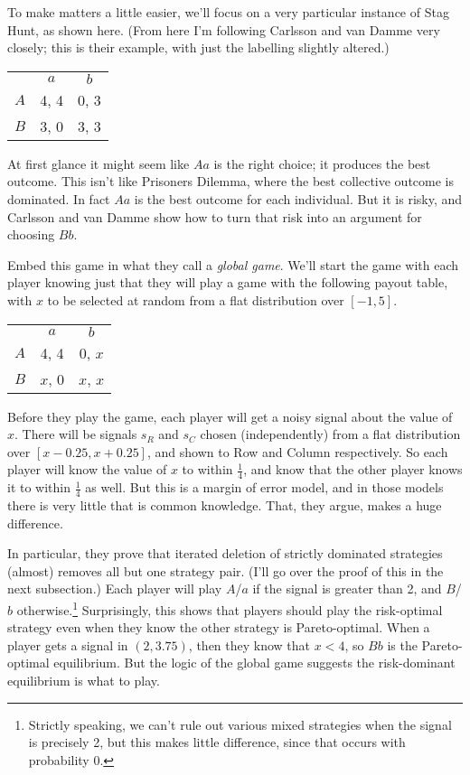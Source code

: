 \documentclass[11pt,]{book}
\let\rmarkdownfootnote\footnote%
\def\footnote{\protect\rmarkdownfootnote}
\def\toprule{}
\def\bottomrule{}
\begin{document}
To make matters a little easier, we'll focus on a very particular instance of Stag Hunt, as shown here. (From here I'm following Carlsson and van Damme very closely; this is their example, with just the labelling slightly altered.)

\begin{longtable}[]{@{}lcc@{}}
\toprule
\endhead
& \(a\) & \(b\)\tabularnewline
\(A\) & 4, 4 & 0, 3\tabularnewline
\(B\) & 3, 0 & 3, 3\tabularnewline
\bottomrule
\end{longtable}

At first glance it might seem like \(Aa\) is the right choice; it produces the best outcome. This isn't like Prisoners Dilemma, where the best collective outcome is dominated. In fact \(Aa\) is the best outcome for each individual. But it is risky, and Carlsson and van Damme show how to turn that risk into an argument for choosing \(Bb\).

Embed this game in what they call a \emph{global game}. We'll start the game with each player knowing just that they will play a game with the following payout table, with \(x\) to be selected at random from a flat distribution over \([-1, 5]\).

\begin{longtable}[]{@{}lcc@{}}
\toprule
\endhead
& \(a\) & \(b\)\tabularnewline
\(A\) & 4, 4 & 0, \(x\)\tabularnewline
\(B\) & \(x\), 0 & \(x\), \(x\)\tabularnewline
\bottomrule
\end{longtable}

Before they play the game, each player will get a noisy signal about the value of \(x\). There will be signals \(s_R\) and \(s_C\) chosen (independently) from a flat distribution over \([x - 0.25, x + 0.25]\), and shown to Row and Column respectively. So each player will know the value of \(x\) to within \(\frac{1}{4}\), and know that the other player knows it to within \(\frac{1}{4}\) as well. But this is a margin of error model, and in those models there is very little that is common knowledge. That, they argue, makes a huge difference.

In particular, they prove that iterated deletion of strictly dominated strategies (almost) removes all but one strategy pair. (I'll go over the proof of this in the next subsection.) Each player will play \(A\)/\(a\) if the signal is greater than 2, and \(B\)/\(b\) otherwise.\footnote{Strictly speaking, we can't rule out various mixed strategies when the signal is precisely 2, but this makes little difference, since that occurs with probability 0.} Surprisingly, this shows that players should play the risk-optimal strategy even when they know the other strategy is Pareto-optimal. When a player gets a signal in \((2, 3.75)\), then they know that \(x < 4\), so \(Bb\) is the Pareto-optimal equilibrium. But the logic of the global game suggests the risk-dominant equilibrium is what to play.
\end{document}
